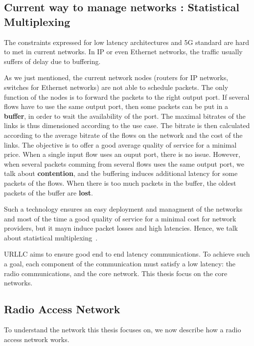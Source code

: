 \subsection{Current way to manage networks : Statistical Multiplexing}


The constraints expressed for low latency architectures and 5G standard are hard to met in current networks. In IP or even Ethernet networks, the traffic usually suffers of delay due to buffering. 

As we just mentioned, the current network nodes (routers for IP networks, switches for Ethernet networks) are not able to schedule packets. The only function of the nodes is to forward the packets to the right output port. If several flows have to use the same output port, then some packets can be put in a \textbf{buffer}, in order to wait the availability of the port. The maximal bitrates of the links is thus dimensioned according to the use case. The bitrate is then calculated according to the average bitrate of the flows on the network and the cost of the links. 
The objective is to offer a good average quality of service for a minimal price. When a single input flow uses an ouput port, there is no issue. However, when several packets comming from several flows uses the same output port, we talk about \textbf{contention}, and the buffering induces additional latency for some packets of the flows. When there is too much packets in the buffer, the oldest packets of the buffer are \textbf{lost}. 

Such a technology ensures an easy deployment and managment of the networks and most of the time a good quality of service for a minimal cost for network providers, but it mayn induce packet losses and high latencies. Hence, we talk about statistical multiplexing~\cite{krishnamurthy2003latency,venkatramani1994supporting}. 

URLLC aims to ensure good end to end latency communications. To achieve such a goal, each component of the communication must satisfy a low latency: the radio communications, and the core network. This thesis focus on the core networks. 

\subsection{\textbf{R}adio \textbf{A}ccess \textbf{N}etwork}
To understand the network this thesis focuses on, we now describe how a radio access network works.

